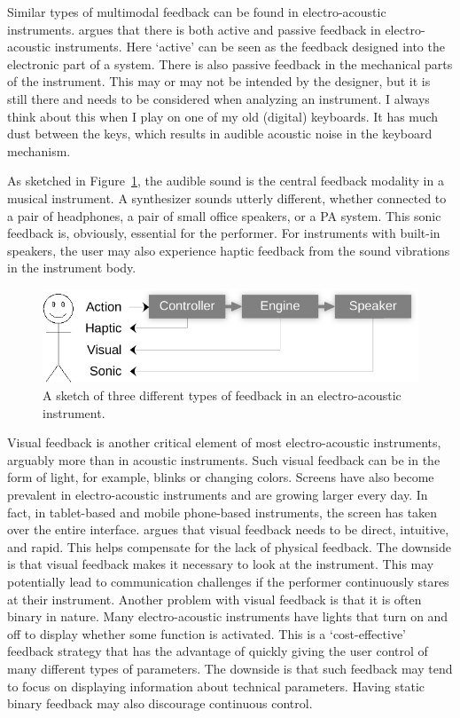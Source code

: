 Similar types of multimodal feedback can be found in electro-acoustic instruments.
\citet{bongers_physical_2000} argues that there is both active and passive feedback in electro-acoustic instruments. Here `active' can be seen as the feedback designed into the electronic part of a system. There is also passive feedback in the mechanical parts of the instrument. This may or may not be intended by the designer, but it is still there and needs to be considered when analyzing an instrument. I always think about this when I play on one of my old (digital) keyboards. It has much dust between the keys, which results in audible acoustic noise in the keyboard mechanism.

As sketched in Figure~\ref{fig:mapping-feedback}, the audible sound is the central feedback modality in a musical instrument. A synthesizer sounds utterly different, whether connected to a pair of headphones, a pair of small office speakers, or a PA system. This sonic feedback is, obviously, essential for the performer. For instruments with built-in speakers, the user may also experience haptic feedback from the sound vibrations in the instrument body.

\begin{figure}[tbp]
	\centering
		\includegraphics[width=0.9\columnwidth]{figures/48-feedback-crop.pdf}
	\caption{A sketch of three different types of feedback in an electro-acoustic instrument.}
	\label{fig:mapping-feedback}
\end{figure}

Visual feedback is another critical element of most electro-acoustic instruments, arguably more than in acoustic instruments. Such visual feedback can be in the form of light, for example, blinks or changing colors. Screens have also become prevalent in electro-acoustic instruments and are growing larger every day. In fact, in tablet-based and mobile phone-based instruments, the screen has taken over the entire interface. \citet{barbosa_direct_2019} argues that visual feedback needs to be direct, intuitive, and rapid. This helps compensate for the lack of physical feedback. The downside is that visual feedback makes it necessary to look at the instrument. This may potentially lead to communication challenges if the performer continuously stares at their instrument. Another problem with visual feedback is that it is often binary in nature. Many electro-acoustic instruments have lights that turn on and off to display whether some function is activated. This is a `cost-effective' feedback strategy that has the advantage of quickly giving the user control of many different types of parameters. The downside is that such feedback may tend to focus on displaying information about technical parameters. Having static binary feedback may also discourage continuous control.

